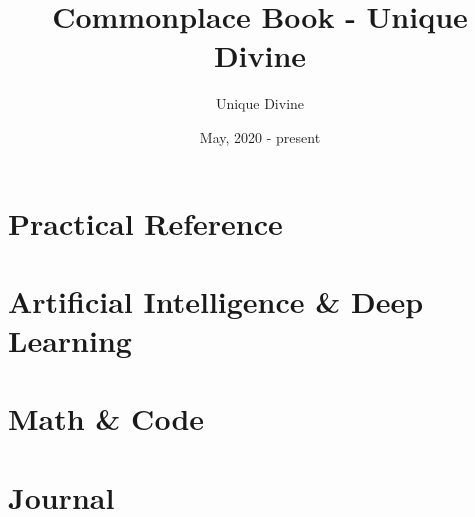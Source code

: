 \documentclass[11pt, fancy, bibstyle=apalike, cite=authoryear]{elegantbook}
\title{Commonplace Book - Unique Divine}
\author{Unique Divine}
\institute{Columbia University}
\date{May, 2020 - present}
\begin{document}
\maketitle
\frontmatter
\tableofcontents



\mainmatter



\part{Practical Reference}


\part{Artificial Intelligence \& Deep Learning}


\part{Math \& Code}







\part{Journal}




\end{document}
